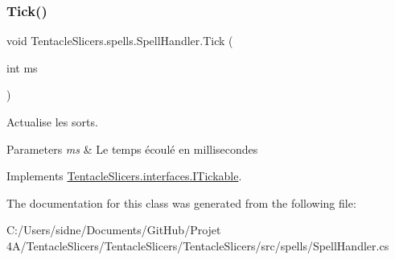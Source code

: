 \subsubsection{\texorpdfstring{Tick()}{Tick()}}
{\footnotesize\ttfamily void Tentacle\+Slicers.\+spells.\+Spell\+Handler.\+Tick (\begin{DoxyParamCaption}\item[{int}]{ms }\end{DoxyParamCaption})}



Actualise les sorts. 


\begin{DoxyParams}{Parameters}
{\em ms} & Le temps écoulé en millisecondes \\
\hline
\end{DoxyParams}


Implements \hyperlink{interface_tentacle_slicers_1_1interfaces_1_1_i_tickable}{Tentacle\+Slicers.\+interfaces.\+I\+Tickable}.



The documentation for this class was generated from the following file\+:\begin{DoxyCompactItemize}
\item 
C\+:/\+Users/sidne/\+Documents/\+Git\+Hub/\+Projet 4\+A/\+Tentacle\+Slicers/\+Tentacle\+Slicers/\+Tentacle\+Slicers/src/spells/Spell\+Handler.\+cs\end{DoxyCompactItemize}
